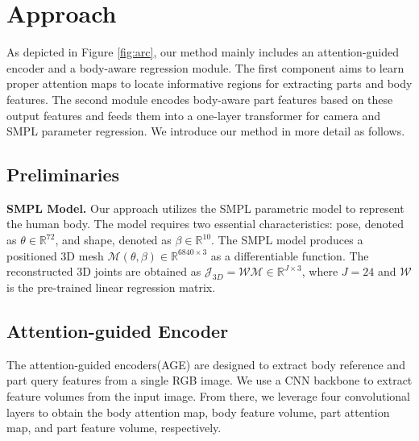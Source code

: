\documentclass[10pt,twocolumn,letterpaper]{article}
\begin{document}
\section{Approach}
As depicted in Figure \ref{fig:arc}, our method mainly includes an attention-guided encoder and a body-aware regression module. The first component aims to learn proper attention maps to locate informative regions for extracting parts and body features. The second module encodes body-aware part features based on these output features and feeds them into a one-layer transformer for camera and SMPL parameter regression. We introduce our method in more detail as follows. 

 

\subsection{Preliminaries}

\textbf{SMPL Model.} Our approach utilizes the SMPL parametric model to represent the human body. The model requires two essential characteristics: pose, denoted as $\theta \in \mathbb{R}^{72}$, and shape, denoted as $\beta \in \mathbb{R}^{10}$. 
The SMPL model produces a positioned 3D mesh $\mathcal{M}(\theta,\beta)\in \mathbb{R}^{6840\times3}$ as a differentiable function. The reconstructed 3D joints are obtained as $\mathcal{J}_{3D}=\mathcal{W} \mathcal{M} \in \mathbb{R}^{J\times 3}$, where $J=24$ and $\mathcal{W}$ is the pre-trained linear regression matrix.

\subsection{Attention-guided Encoder}
The attention-guided encoders(AGE) are designed to extract body reference and part query features from a single RGB image. We use a CNN backbone to extract feature volumes from the input image. From there, we leverage four convolutional layers to obtain the body attention map, body feature volume, part attention map, and part feature volume, respectively. 
\end{document}
